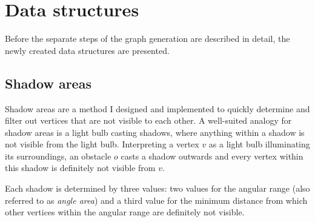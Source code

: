 \section{Data structures}
	
	Before the separate steps of the graph generation are described in detail, the newly created data structures are presented.
		
	\subsection{Shadow areas}
	\label{subsec:shadow-areas}
		
		Shadow areas are a method I designed and implemented to quickly determine and filter out vertices that are not visible to each other.
		A well-suited analogy for shadow areas is a light bulb casting shadows, where anything within a shadow is not visible from the light bulb.
		Interpreting a vertex $v$ as a light bulb illuminating its surroundings, an obstacle $o$ casts a shadow outwards and every vertex within this shadow is definitely not visible from $v$.
		
		Each shadow is determined by three values: two values for the angular range (also referred to as \emph{angle area}) and a third value for the minimum distance from which other vertices within the angular range are definitely not visible.
		
